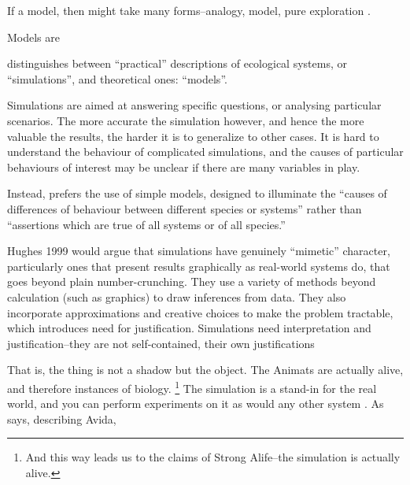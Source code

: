 If a model, then might take many forms--analogy, model, pure exploration \autocite{Webb2009}.

Models are 

\autocite{MaynardSmith1974} distinguishes between
``practical'' descriptions of ecological systems, or ``simulations'', and
theoretical ones: ``models''.

Simulations are aimed at answering specific questions, or analysing
particular scenarios. The more accurate the simulation however, and
hence the more valuable the results, the harder it is to generalize to
other cases. It is hard to understand the behaviour of complicated
simulations, and the causes of particular behaviours of interest may be
unclear if there are many variables in play.

Instead, \autocite{MaynardSmith1974} prefers the use of simple models, designed
to illuminate the ``causes of differences of behaviour between different
species or systems'' rather than ``assertions which are true of all
systems or of all species.''

Hughes 1999 would argue that simulations have genuinely ``mimetic''
character, particularly ones that present results graphically as
real-world systems do, that goes beyond plain number-crunching. They use
a variety of methods beyond calculation (such as graphics) to draw
inferences from data. They also incorporate approximations and creative
choices to make the problem tractable, which introduces need for
justification. Simulations need interpretation and justification--they
are not self-contained, their own justifications
\autocite[31]{Winsberg2010}

\label{simulations-are-themselves-an-instance-of-the-thing}

That is, the thing is not a shadow but the object. The Animats are
actually alive, and therefore instances of biology.
\footnote{And this way leads us to the claims of Strong Alife--the simulation is actually alive.}
The simulation is a stand-in for the real world, and you can perform
experiments on it as would any other system
\autocite[31]{Winsberg2010}. As \autocite{Adami2002} says, describing
Avida,

